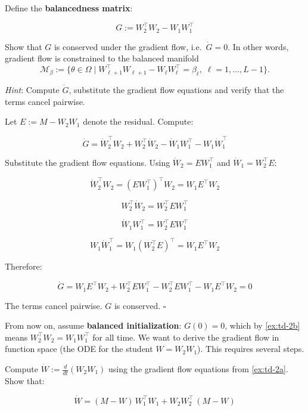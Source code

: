 \documentclass[11pt]{article}
\begin{document}
\begin{exercise}
\label{ex:td-2b}
Define the \textbf{balancedness matrix}:

\[G := W_2^\top W_2 - W_1 W_1^\top\]

Show that \(G\) is conserved under the gradient flow,
i.e.~\(\dot{G} = 0\). In other words, gradient flow is constrained to the balanced manifold \begin{equation*}
    \mathcal{M}_{\beta}
    :=
    \{\theta\in\Omega\mid
    W_{\ell+1}^{\top}W_{\ell+1}
    -
    W_{\ell}W_{\ell}^{\top}
    =
    \beta_\ell,\;
    \ell=1,\ldots,L-1\}.
\end{equation*}

\emph{Hint}: Compute
\(\dot{G}\),
substitute the gradient flow equations and verify that the
terms cancel pairwise.
\end{exercise}

\begin{solution}[ex:td-2b]
Let \(E := M - W_2 W_1\) denote the residual. Compute:

\[\dot{G} = \dot{W}_2^\top W_2 + W_2^\top \dot{W}_2 - \dot{W}_1 W_1^\top - W_1 \dot{W}_1^\top\]

Substitute the gradient flow equations. Using \(\dot{W}_2 = E W_1^\top\)
and \(\dot{W}_1 = W_2^\top E\):

\[\dot{W}_2^\top W_2 = (E W_1^\top)^\top W_2 = W_1 E^\top W_2\]

\[W_2^\top \dot{W}_2 = W_2^\top E W_1^\top\]

\[\dot{W}_1 W_1^\top = W_2^\top E W_1^\top\]

\[W_1 \dot{W}_1^\top = W_1(W_2^\top E)^\top = W_1 E^\top W_2\]

Therefore:

\[\dot{G} = W_1 E^\top W_2 + W_2^\top E W_1^\top - W_2^\top E W_1^\top - W_1 E^\top W_2 = 0\]

The terms cancel pairwise. \(G\) is conserved. \(\square\)
\end{solution}

From now on, assume \textbf{balanced initialization}:
\(G(0) = 0\), which by \cref{ex:td-2b} means \(W_2^\top W_2 = W_1 W_1^\top\)
for all time. We want to derive the gradient flow in function space (the
ODE for the student \(W = W_2 W_1\)). This requires several steps.

\begin{exercise}
\label{ex:td-2ci}
Compute \(\dot{W} := \frac{d}{dt}(W_2 W_1)\) using the
gradient flow equations from \cref{ex:td-2a}. Show that:

\[\dot{W} = (M - W)\, W_1^\top W_1 + W_2 W_2^\top\, (M - W)\]
\end{exercise}
\end{document}
